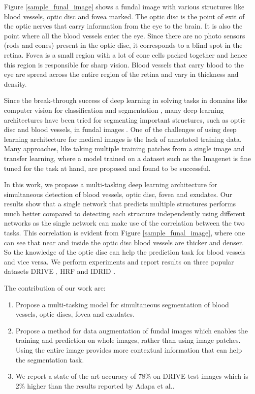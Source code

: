 \documentclass{article}
\begin{document}
Figure \ref{sample_funal_image} shows a fundal image with various structures like blood vessels, optic disc and fovea marked.
The optic disc is the point of exit of the optic nerves that carry information from the eye to the brain.
It is also the point where all the blood vessels enter the eye.
Since there are no photo sensors (rods and cones) present in the optic disc, it corresponds to a blind spot in the retina.
Fovea is a small region with a lot of cone cells packed together and hence this region is responsible for sharp vision.
Blood vessels that carry blood to the eye are spread across the entire region of the retina and vary in thickness and density.

Since the break-through success of deep learning in solving tasks in domains like computer vision for classification \cite{krizhevsky2012imagenet} \cite{simonyan2014very} and segmentation \cite{chen2017deeplab}, many deep learning architectures have been tried for segmenting important structures, such as optic disc and blood vessels, in fundal images \cite {vengalil2016customizing} \cite{zhuang2018laddernet} \cite{jiang2018retinal} \cite{park2020m}.
One of the challenges of using deep learning architecture for medical images is the lack of annotated training data.
Many approaches, like taking multiple training patches from  a single image \cite{vengalil2016customizing} and transfer learning, where a model trained on a dataset such as the Imagenet \cite{deng2009imagenet} is fine tuned for the task at hand, are proposed and found to be successful.

In this work, we propose a multi-tasking deep learning architecture for simultaneous detection of blood vessels, optic disc, fovea and exudates.
Our results show that a single network that predicts multiple structures  performs much better compared to detecting  each structure independently using different networks as the single network can make use of the correlation between the two tasks.
This correlation is evident from Figure \ref{sample_funal_image}, where one can see that near and inside the optic disc blood vessels are thicker and denser.
So the knowledge of the optic disc can help the prediction task for blood vessels and vice versa.
We perform experiments and report results on three popular datasets DRIVE \cite{drive}, HRF \cite{budai2013robust} and IDRID \cite{h25w98-18}.

The contribution of our work are:
\begin{enumerate}
  \item Propose a multi-tasking model for simultaneous segmentation of blood vessels, optic discs, fovea and exudates.
  \item Propose a method for data augmentation of fundal images which enables the training and prediction on whole images, rather than using image patches.
  Using the entire image provides more contextual information that can help the segmentation task.
  \item We report a state of the art accuracy of 78\% on DRIVE test images which is 2\% higher than the results reported by Adapa et al.\cite{adapa2020supervised}.
\end{enumerate}
\end{document}
